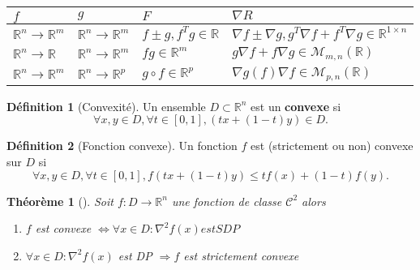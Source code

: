 \documentclass{article}
\theoremstyle{plain}%
\newtheorem{thm}{Théorème}[section]
\theoremstyle{definition}
\newtheorem{defn}{Définition}[section]
\begin{document}
\begin{table}[!ht]
    \centering
    \begin{tabular}{|l|l|l|l|}
    \hline
        $f$ & $g$ & $F$ & $\nabla R$ \\ \hline
        $\mathbb{R}^n \to \mathbb{R}^m $ & $\mathbb{R}^n \to \mathbb{R}^m $ & $ f \pm g, f^Tg \in \mathbb{R}$ & $ \nabla f \pm \nabla g , g^T \nabla f + f^T \nabla g \in \mathbb{R}^{1\times n} $ \\ \hline
        $\mathbb{R}^n \to \mathbb{R} $ & $\mathbb{R}^n \to \mathbb{R}^m $ & $ fg \in \mathbb{R}^m $ & $g \nabla f + f \nabla g \in \mathcal{M}_{m,n}(\mathbb{R}) $ \\ \hline
        $\mathbb{R}^n \to \mathbb{R}^m $ & $\mathbb{R}^n \to \mathbb{R}^p $ & $ g \circ f \in \mathbb{R}^p $ & $ \nabla g(f) \nabla f \in \mathcal{M}_{p,n}(\mathbb{R}) $ \\ \hline
    \end{tabular}
\end{table}

\begin{defn}[Convexité]
    Un ensemble $ D \subset \mathbb{R}^n $ est un \textbf{convexe} si 
    \[
        \forall x,y \in D, \forall t \in [0,1], (tx + (1-t)y) \in D
    .\]
\end{defn}

\begin{defn}[Fonction convexe]
    Un fonction $ f $ est (strictement ou non) convexe sur $ D $ si 
    \[
        \forall x,y \in D, \forall t \in [0,1], f(tx+(1-t)y) \leq t f(x) + (1-t)f(y)
    .\]
\end{defn}

\begin{thm}[]
    Soit $ f:D \to \mathbb{R}^n $ une fonction de classe $ \mathcal{C}^2 $ alors 
    \begin{enumerate}
        \item $ f $ est convexe $ \Leftrightarrow \forall x \in D: \nabla ^2 f(x) est SDP$ 
        \item $ \forall x \in D: \nabla ^2 f(x) $ est DP $ \Rightarrow f $ est strictement convexe
    \end{enumerate}
\end{thm}
\end{document}
